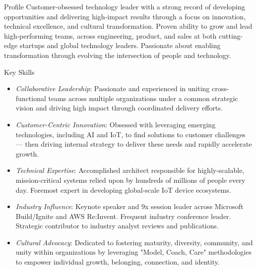 \documentclass{resume} %
\begin{document}
\vspace{-1em}
\begin{rSection}{Profile}
  Customer-obsessed technology leader with a strong record of developing opportunities and delivering high-impact results through a focus on innovation, technical excellence, and cultural transformation. Proven ability to grow and lead high-performing teams, across engineering, product, and sales at both cutting-edge startups and global technology leaders. Passionate about enabling transformation through evolving the intersection of people and technology.

\end{rSection}

\begin{rSection}{Key Skills}
  \begin{itemize}
    \setlength\itemsep{-0.5em}
    \item \textit{Collaborative Leadership}: Passionate and experienced in uniting cross-functional teams across multiple organizations under a common strategic vision and driving high impact through coordinated delivery efforts.
    \item \textit{Customer-Centric Innovation}: Obsessed with leveraging emerging technologies, including AI and IoT, to find solutions to customer challenges --- then driving internal strategy to deliver these needs and rapidly accelerate growth.
    \item \textit{Technical Expertise}: Accomplished architect responsible for highly-scalable, mission-critical systems relied upon by hundreds of millions of people every day. Foremost expert in developing global-scale IoT device ecosystems.
    \item \textit{Industry Influence}: Keynote speaker and 9x session leader across Microsoft Build/Ignite and AWS Re:Invent. Frequent industry conference leader. Strategic contributor to industry analyst reviews and publications.
    \item \textit{Cultural Advocacy}: Dedicated to fostering maturity, diversity, community, and unity within organizations by leveraging "Model, Coach, Care" methodologies to empower individual growth, belonging, connection, and identity.
  \end{itemize}
  
\end{rSection}
\end{document}
